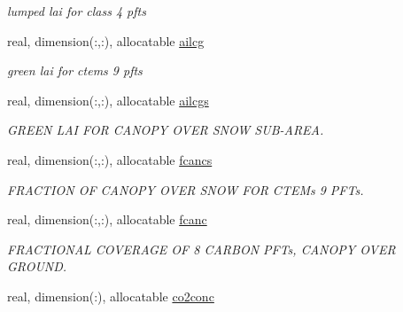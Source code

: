 \begin{DoxyCompactItemize}
\begin{DoxyCompactList}\small\item\em lumped lai for class\textquotesingle{} 4 pfts \end{DoxyCompactList}\item 
\hypertarget{structctem__statevars_1_1veg__gat_aa07707a816b5904a8e8181bd4d1a716d}{}real, dimension(\+:,\+:), allocatable \hyperlink{structctem__statevars_1_1veg__gat_aa07707a816b5904a8e8181bd4d1a716d}{ailcg}\label{structctem__statevars_1_1veg__gat_aa07707a816b5904a8e8181bd4d1a716d}

\begin{DoxyCompactList}\small\item\em green lai for ctem\textquotesingle{}s 9 pfts \end{DoxyCompactList}\item 
\hypertarget{structctem__statevars_1_1veg__gat_aa278358bdfce2adb922ae5384790bfdb}{}real, dimension(\+:,\+:), allocatable \hyperlink{structctem__statevars_1_1veg__gat_aa278358bdfce2adb922ae5384790bfdb}{ailcgs}\label{structctem__statevars_1_1veg__gat_aa278358bdfce2adb922ae5384790bfdb}

\begin{DoxyCompactList}\small\item\em G\+R\+E\+E\+N L\+A\+I F\+O\+R C\+A\+N\+O\+P\+Y O\+V\+E\+R S\+N\+O\+W S\+U\+B-\/\+A\+R\+E\+A. \end{DoxyCompactList}\item 
\hypertarget{structctem__statevars_1_1veg__gat_a2c17cb1f29f7178d4cba05cc321a2b07}{}real, dimension(\+:,\+:), allocatable \hyperlink{structctem__statevars_1_1veg__gat_a2c17cb1f29f7178d4cba05cc321a2b07}{fcancs}\label{structctem__statevars_1_1veg__gat_a2c17cb1f29f7178d4cba05cc321a2b07}

\begin{DoxyCompactList}\small\item\em F\+R\+A\+C\+T\+I\+O\+N O\+F C\+A\+N\+O\+P\+Y O\+V\+E\+R S\+N\+O\+W F\+O\+R C\+T\+E\+M\textquotesingle{}s 9 P\+F\+Ts. \end{DoxyCompactList}\item 
\hypertarget{structctem__statevars_1_1veg__gat_a32ee03512d87091110c312e0d8a3643d}{}real, dimension(\+:,\+:), allocatable \hyperlink{structctem__statevars_1_1veg__gat_a32ee03512d87091110c312e0d8a3643d}{fcanc}\label{structctem__statevars_1_1veg__gat_a32ee03512d87091110c312e0d8a3643d}

\begin{DoxyCompactList}\small\item\em F\+R\+A\+C\+T\+I\+O\+N\+A\+L C\+O\+V\+E\+R\+A\+G\+E O\+F 8 C\+A\+R\+B\+O\+N P\+F\+Ts, C\+A\+N\+O\+P\+Y O\+V\+E\+R G\+R\+O\+U\+N\+D. \end{DoxyCompactList}\item 
\hypertarget{structctem__statevars_1_1veg__gat_aaae77d1710d5d5734696d4ebe860215f}{}real, dimension(\+:), allocatable \hyperlink{structctem__statevars_1_1veg__gat_aaae77d1710d5d5734696d4ebe860215f}{co2conc}\label{structctem__statevars_1_1veg__gat_aaae77d1710d5d5734696d4ebe860215f}


\end{DoxyCompactItemize}
